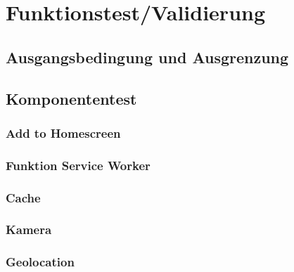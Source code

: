 \chapter{Funktionstest/Validierung}\label{chap:Funktionstest}
\thispagestyle{standard}
\pagestyle{standard}

\section{Ausgangsbedingung und Ausgrenzung}


\section{Komponententest}



\subsection{Add to Homescreen}



\subsection{Funktion Service Worker}



\subsection{Cache}

\subsection{Kamera}


\subsection{Geolocation}




